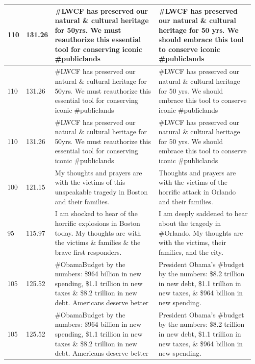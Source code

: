 \documentclass[11pt]{article}
\begin{document}
\begin{flushleft}
\begin{table}[]
\begin{tabular}{|p{}|p{}|p{}|p{}|}
110      & 131.26    & \#LWCF has preserved our natural \& cultural heritage for 50yrs. We must reauthorize this essential tool for conserving iconic \#publiclands         & \#LWCF has preserved our natural \& cultural heritage for 50 yrs. We should embrace this tool to conserve iconic \#publiclands                        \\ \hline
110      & 131.26    & \#LWCF has preserved our natural \& cultural heritage for 50yrs. We must reauthorize this essential tool for conserving iconic \#publiclands         & \#LWCF has preserved our natural \& cultural heritage for 50 yrs. We should embrace this tool to conserve iconic \#publiclands                        \\ \hline
110      & 131.26    & \#LWCF has preserved our natural \& cultural heritage for 50yrs. We must reauthorize this essential tool for conserving iconic \#publiclands         & \#LWCF has preserved our natural \& cultural heritage for 50 yrs. We should embrace this tool to conserve iconic \#publiclands                        \\ \hline
100      & 121.15    & My thoughts and prayers are with the victims of this unspeakable tragedy in Boston and their families.                                                   & Thoughts and prayers are with the victims of the horrific attack in Orlando and their families.                                                           \\ \hline
95       & 115.97    & I am shocked to hear of the horrific explosions in Boston today. My thoughts are with the victims \& families \& the brave first responders.     & I am deeply saddened to hear about the tragedy in \#Orlando. My thoughts are with the victims, their families, and the city.                              \\ \hline
105      & 125.52    & \#ObamaBudget by the numbers: \$964 billion in new spending, \$1.1 trillion in new taxes \& \$8.2 trillion in new debt. Americans deserve better       & President Obama’s \#budget by the numbers: \$8.2 trillion in new debt, \$1.1 trillion in new taxes, \& \$964 billion in new spending.                   \\ \hline
105      & 125.52    & \#ObamaBudget by the numbers: \$964 billion in new spending, \$1.1 trillion in new taxes \& \$8.2 trillion in new debt. Americans deserve better       & President Obama’s \#budget by the numbers: \$8.2 trillion in new debt, \$1.1 trillion in new taxes, \& \$964 billion in new spending.                   \\ \hline

\end{tabular}
\end{table}
\end{flushleft}
\end{document}
